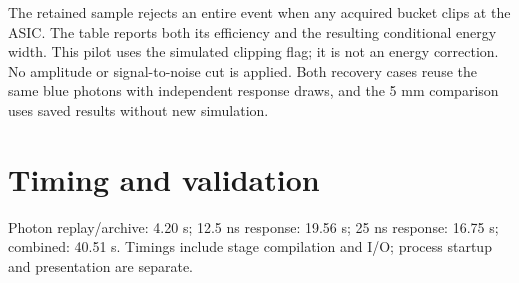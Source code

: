\documentclass[11pt,a4paper]{article}
\begin{document}
The retained sample rejects an entire event when any acquired bucket clips at the ASIC. The table reports both its efficiency and the resulting conditional energy width. This pilot uses the simulated clipping flag; it is not an energy correction. No amplitude or signal-to-noise cut is applied. Both recovery cases reuse the same blue photons with independent response draws, and the 5 mm comparison uses saved results without new simulation.
\section*{Timing and validation}
Photon replay/archive: 4.20 s; 12.5 ns response: 19.56 s; 25 ns response: 16.75 s; combined: 40.51 s. Timings include stage compilation and I/O; process startup and presentation are separate.
\end{document}
